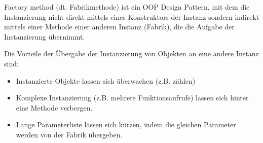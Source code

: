 Factory method (dt. Fabrikmethode) ist ein OOP Design Pattern, mit dem die Instanzierung nicht direkt mittels eines Konstruktors der Instanz 
sondern indirekt mittels einer Methode einer anderen Instanz (Fabrik), die die Aufgabe der Instanzierung übernimmt.

Die Vorteile der Übergabe der Instanzierung von Objekten an eine andere Instanz sind:
\begin{itemize}
    \item Instanzierte Objekte lassen sich überwachen (z.B. zählen)
    \item Komplexe Instanzierung (z.B. mehrere Funktionsaufrufe) lassen sich hinter eine Methode verbergen.
    \item Lange Parameterliste lässen sich kürzen, indem die gleichen Parameter werden von der Fabrik übergeben.
\end{itemize}